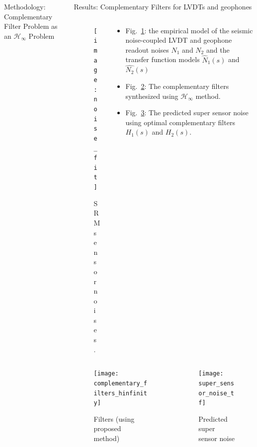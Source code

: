 \documentclass{beamer}
\begin{document}
\begin{frame}[t]
\begin{columns}[t]
\begin{column}{0.32\linewidth}
\begin{block}{Methodology: Complementary Filter Problem as an $\mathcal{H}_\infty$ Problem}
\begin{itemize}
			\end{itemize}
			\end{block}
		\end{column}
	
		\begin{column}{0.32\linewidth}
			\begin{block}{Results: Complementary Filters for LVDTs and geophones}
			\begin{columns}[t, onlytextwidth]
				
				\begin{column}{0.5\textwidth}
					\begin{figure}
						\centering
						\texttt{[image: noise\_fit]}
						\caption{SRM sensor noises.}
						\label{fig:noise_fit}
					\end{figure}
				\end{column}
				\begin{column}{0.5\textwidth}
					\begin{itemize}
						\item Fig.~\ref{fig:noise_fit}: the empirical model of the seismic noise-coupled LVDT and geophone readout noises $N_1$ and $N_2$ and the transfer function models $\hat{N}_1(s)$ and $\hat{N_2}(s)$
						\item Fig.~\ref{fig:complementary_filters_hinfinity}: The complementary filters synthesized using $\mathcal{H}_\infty$ method.
						\item Fig.~\ref{fig:super_sensor_noise_tf}: The predicted super sensor noise using optimal complementary filters $H_1(s)$ and $H_2(s)$.
					\end{itemize}
				\end{column}
			\end{columns}
			
			\begin{columns}[onlytextwidth]
				\begin{column}{0.5\textwidth}
					\begin{figure}
						\centering
						\texttt{[image: complementary\_filters\_hinfinity]}
						\caption{Filters (using proposed method)}
						\label{fig:complementary_filters_hinfinity}
					\end{figure}
				\end{column}
				\begin{column}{0.5\textwidth}
					
					\begin{figure}
						\centering
						\texttt{[image: super\_sensor\_noise\_tf]}
						\caption{Predicted super sensor noise}
						\label{fig:super_sensor_noise_tf}
					\end{figure}
				\end{column}
			\end{columns}
			

\end{block}
\end{column}
\end{columns}
\end{frame}
\end{document}
